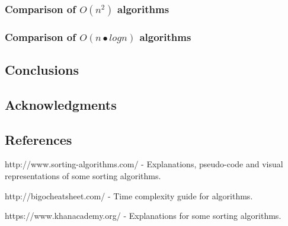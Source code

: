 \documentclass{acm_proc_article-sp}
\begin{document}
\subsubsection{Comparison of $O(n^{2})$ algorithms}
\subsubsection{Comparison of $O(n•logn)$ algorithms}
\subsection{Conclusions}
\subsection{Acknowledgments}

\subsection{References}
http://www.sorting-algorithms.com/ - Explanations, pseudo-code and visual representations of some sorting algorithms.

http://bigocheatsheet.com/ - Time complexity guide for algorithms.

https://www.khanacademy.org/ - Explanations for some sorting algorithms.
\balancecolumns
\end{document}
